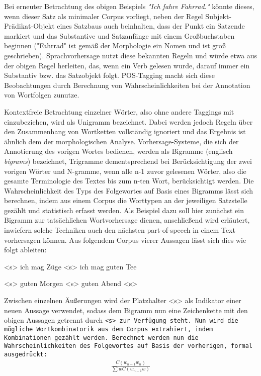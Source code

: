 \documentclass[12pt]{report}
\begin{document}
Bei erneuter Betrachtung des obigen Beispiels \textit{"Ich fahre Fahrrad."} könnte dieses, wenn dieser Satz als minimaler Corpus vorliegt, neben der Regel Subjekt-Prädikat-Objekt eines Satzbaus auch beinhalten, dass der Punkt ein Satzende markiert und das Substantive und Satzanfänge mit einem Großbuchstaben beginnen ("Fahrrad" ist gemäß der Morphologie ein Nomen und ist groß geschrieben). Sprachvorhersage nutzt diese bekannten Regeln und würde etwa aus der obigen Regel herleiten, das, wenn ein Verb gelesen wurde, darauf immer ein Substantiv bzw. das Satzobjekt folgt. POS-Tagging macht sich diese Beobachtungen durch Berechnung von Wahrscheinlichkeiten bei der Annotation von Wortfolgen zunutze. 

Kontextfreie Betrachtung einzelner Wörter, also ohne andere Taggings mit einzubeziehen, wird als Unigramm bezeichnet. Dabei werden jedoch Regeln über den Zusammenhang von Wortketten vollständig ignoriert und das Ergebnis ist ähnlich dem der morphologischen Analyse. Vorhersage-Systeme, die sich der Annotierung des vorigen Wortes bedienen, werden als Bigramme (englisch \textit{bigrams}) bezeichnet, Trigramme dementsprechend bei Berücksichtigung der zwei vorigen Wörter und N-gramme, wenn alle n-1 zuvor gelesenen Wörter, also die gesamte Terminologie des Textes bis zum n-ten Wort, berücksichtigt werden.
Die Wahrscheinlichkeit des Typs des Folgewortes auf Basis eines Bigramms lässt sich berechnen, indem aus einem Corpus die Worttypen an der jeweiligen Satzstelle gezählt und statistisch erfasst werden. 
Als Beispiel dazu soll hier zunächst ein Bigramm zur tatsächlichen Wortvorhersage dienen, anschließend wird erläutert, inwiefern solche Techniken auch den nächsten part-of-speech in einem Text vorhersagen können. Aus folgendem Corpus vierer Aussagen lässt sich dies wie folgt ableiten:
\\ \tt

<s> ich mag Züge <s> ich mag guten Tee 


<s> guten Morgen <s> guten Abend <s>
\\ \rm

Zwischen einzelnen Äußerungen wird der Platzhalter <s> als Indikator einer neuen Aussage verwendet, sodass dem Bigramm nun eine Zeichenkette mit den obigen Aussagen getrennt durch \tt <s> \rm zur Verfügung steht. Nun wird die mögliche Wortkombinatorik aus dem Corpus extrahiert, indem Kombinationen gezählt werden. Berechnet werden nun die Wahrscheinlichkeiten des Folgewortes auf Basis der vorherigen, formal ausgedrückt: \begin{align}
\frac{C(w_{n-1} w_{n})}{\sum{w}{}C(w_{n-1}w)}
\end{align}
\end{document}
